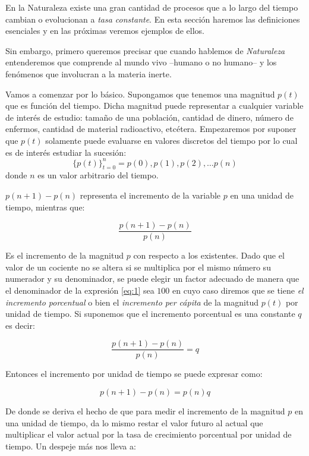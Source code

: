 

En la Naturaleza existe una gran cantidad de procesos que a lo largo del tiempo cambian o evolucionan a {\it tasa constante}. En esta sección haremos las definiciones esenciales y en las próximas veremos ejemplos de ellos.

Sin embargo, primero queremos precisar que cuando hablemos de {\it Naturaleza } entenderemos que comprende al mundo vivo --humano o no humano-- y los fenómenos que involucran a la materia inerte.

Vamos a  comenzar por lo básico. Supongamos que tenemos una magnitud $p(t)$ que es función del tiempo. Dicha magnitud puede representar a cualquier variable de interés de estudio: tamaño de una población, cantidad de dinero, número de enfermos, cantidad de material radioactivo, etcétera. Empezaremos por suponer que $p(t)$ solamente puede evaluarse en valores discretos del tiempo por lo cual es de interés estudiar la sucesión:
\[
\{p(t)\}_{t=0}^n = p(0),p(1),p(2),\hdots p(n)
\]
\noindent donde $n$ es un valor arbitrario del tiempo.

$p(n+1)-p(n)$ representa el incremento de la variable $p$ en una unidad de tiempo, mientras que:

 
\begin{equation} \label{eq:1}
 \dfrac {p(n+1) -p(n) }{p(n)}
\end{equation}

 
 Es el incremento de la magnitud $p$ con respecto a los existentes. Dado que el valor de un cociente no se altera si se multiplica por el mismo número su numerador y su denominador, se puede elegir un factor adecuado de manera que el denominador de la expresión \ref{eq:1} sea $100$ en cuyo caso diremos que se tiene  \emph{el incremento porcentual} o bien el \emph{incremento per cápita} de la magnitud $p(t)$ por unidad de tiempo. Si suponemos que el incremento porcentual es una constante $q$ es decir:
 
  \begin{equation} \label{eq:2}
 \dfrac {p(n+1) -p(n) }{p(n)}=q
\end{equation}

\noindent Entonces el incremento por unidad de tiempo se puede expresar como: 

 \begin{equation} \label{eq:3}
 p(n+1) -p(n)=p(n)q
\end{equation}

De donde se deriva el hecho de que para medir el incremento de la magnitud $p$ en una unidad de tiempo, da lo mismo restar el valor futuro al actual que multiplicar el valor actual por la tasa de crecimiento porcentual por unidad de tiempo. Un despeje más nos lleva a:

